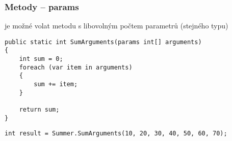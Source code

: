 \begin{frame}[fragile]
\frametitle{Metody -- params}
\begin{bitemize}{}
\item je možné volat metodu s libovolným počtem parametrů (stejného typu)
\end{bitemize}

\begin{yesblock}
\begin{lstlisting}[basicstyle=\small]
public static int SumArguments(params int[] arguments)
{
    int sum = 0;
    foreach (var item in arguments)
    {
        sum += item;
    }

    return sum;
}
\end{lstlisting}
\end{yesblock}

\begin{yesblock}
\begin{lstlisting}[basicstyle=\small]
int result = Summer.SumArguments(10, 20, 30, 40, 50, 60, 70);
\end{lstlisting}
\end{yesblock}
\end{frame}


